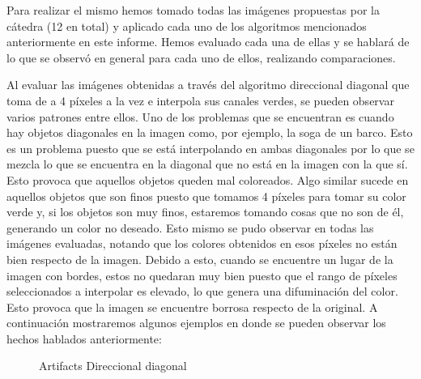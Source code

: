 \documentclass[10pt, a4paper]{article}
\begin{document}
Para realizar el mismo hemos tomado todas las im\'agenes propuestas por la c\'atedra (12 en total) y aplicado cada uno de los algoritmos mencionados anteriormente en este informe. Hemos evaluado cada una de ellas y se hablar\'a de lo que se observ\'o en general para cada uno de ellos, realizando comparaciones. 

Al evaluar las im\'agenes obtenidas a trav\'es del algoritmo direccional diagonal que toma de a 4 p\'ixeles a la vez e interpola sus canales verdes, se pueden observar varios patrones entre ellos. Uno de los problemas que se encuentran es cuando hay objetos diagonales en la imagen como, por ejemplo, la soga de un barco. Esto es un problema puesto que se est\'a interpolando en ambas diagonales por lo que se mezcla lo que se encuentra en la diagonal que no est\'a en la imagen con la que s\'i. Esto provoca que aquellos objetos queden mal coloreados. Algo similar sucede en aquellos objetos que son finos puesto que tomamos 4 p\'ixeles para tomar su color verde y, si los objetos son muy finos, estaremos tomando cosas que no son de \'el, generando un color no deseado. Esto mismo se pudo observar en todas las im\'agenes evaluadas, notando que los colores obtenidos en esos p\'ixeles no est\'an bien respecto de la imagen. Debido a esto, cuando se encuentre un lugar de la imagen con bordes, estos no quedaran muy bien puesto que el rango de p\'ixeles seleccionados a interpolar es elevado, lo que genera una difuminaci\'on del color. Esto provoca que la imagen se encuentre borrosa respecto de la original. A continuaci\'on mostraremos algunos ejemplos en donde se pueden observar los hechos hablados anteriormente:

\begin{figure}[H]
\centering
	\caption{Artifacts Direccional diagonal} 
\end{figure}
\end{document}
